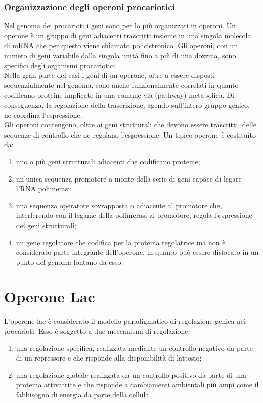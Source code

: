 \documentclass{article}
\begin{document}
\subsubsection{Organizzazione degli operoni procariotici}
Nel genoma dei procarioti i geni sono per lo più organizzati in operoni. Un operone è un gruppo di geni adiacenti trascritti insieme in una singola molecola di
mRNA che per questo viene chiamato policistronico. Gli operoni, con un numero di geni variabile dalla singola unità fino a più di una dozzina, sono specifici
degli organismi procariotici.\\
Nella gran parte dei casi i geni di un operone, oltre a essere disposti 
sequenzialmente nel genoma, sono anche funzionalmente correlati in quanto codificano
proteine implicate in una comune via (pathway) metabolica. Di conseguenza, la
regolazione della trascrizione, agendo sull'intero gruppo genico, ne coordina l'espressione.\\
Gli operoni contengono, oltre ai geni strutturali che devono essere trascritti, delle sequenze di
controllo che ne regolano l'espressione.
Un tipico operone è costituito da:
\begin{enumerate}
    \item uno o più geni strutturali adiacenti che codificano proteine;
    \item un'unica sequenza promotore a monte della serie di geni capace di legare l'RNA polimerasi;
    \item una sequenza operatore sovrapposta o adiacente al promotore che, interferendo con il legame della polimerasi al promotore, regola l'espressione dei geni strutturali;
    \item un gene regolatore che codifica per la
    proteina regolatrice ma non è considerato parte integrante dell'operone, in quanto
    può essere dislocato in un punto del genoma lontano da esso.
\end{enumerate}
\section{Operone Lac}
L'operone lac è considerato il modello paradigmatico di regolazione genica nei procarioti. Esso è soggetto a due meccanismi di regolazione:
\begin{enumerate}
    \item una regolazione specifica, realizzata mediante un controllo negativo da parte
    di un repressore e che risponde alla disponibilità di lattosio; 
    \item una regolazione globale realizzata da un controllo positivo da parte
    di una proteina attivatrice e che risponde a cambiamenti ambientali più ampi
    come il fabbisogno di energia da parte della cellula.
\end{enumerate}
\end{document}
